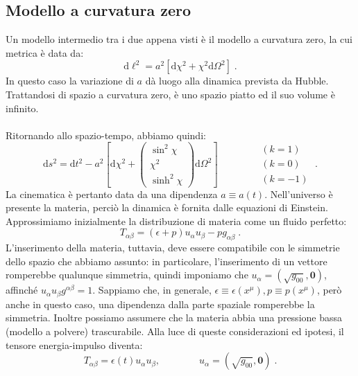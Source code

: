\documentclass[12pt,a4paper]{report}
\theoremstyle{definition}
\newcommand{\diff}[1][]{\mathrm{d}#1}
\begin{document}
\subsection{Modello a curvatura zero}
Un modello intermedio tra i due appena visti è il modello a curvatura zero, la cui metrica è data da:
\begin{equation}
\diff{\ell}^2=a^2[\diff{\chi}^2+\chi^2\diff{\Omega}^2]\;.
\end{equation}
In questo caso la variazione di $a$ dà luogo alla dinamica prevista da Hubble. Trattandosi di spazio a curvatura zero, è uno spazio piatto ed il suo volume è infinito. \\
\\
Ritornando allo spazio-tempo, abbiamo quindi:
\begin{equation}
\diff{s}^2=\diff{t}^2-a^2\left[\diff{\chi}^2+\begin{pmatrix}
\sin^2\chi \\
\chi^2 \\
\sinh^2\chi
\end{pmatrix}\diff{\Omega}^2\right]\qquad\qquad \begin{matrix}
(k=1) \\
(k=0)\\
(k=-1)
\end{matrix}\;.
\end{equation}
La cinematica è pertanto data da una dipendenza $a\equiv a(t)$. Nell'universo è presente la materia, perciò la dinamica è fornita dalle equazioni di Einstein. \\
Approssimiamo inizialmente la distribuzione di materia come un fluido perfetto:
\begin{equation}
T_{\alpha\beta}=(\epsilon+p)u_{\alpha}u_{\beta}-pg_{\alpha\beta}\;.
\end{equation}
L'inserimento della materia, tuttavia, deve essere compatibile con le simmetrie dello spazio che abbiamo assunto: in particolare, l'inserimento di un vettore romperebbe qualunque simmetria, quindi imponiamo che $u_{\alpha}=(\sqrt{g_{00}},\mathbf{0})$, affinché $u_{\alpha}u_{\beta}g^{\alpha\beta}=1$. Sappiamo che, in generale, $\epsilon\equiv\epsilon(x^{\mu}),p\equiv p(x^{\mu})$, però anche in questo caso, una dipendenza dalla parte spaziale romperebbe la simmetria. Inoltre possiamo assumere che la materia abbia una pressione bassa (modello a polvere) trascurabile. Alla luce di queste considerazioni ed ipotesi, il tensore energia-impulso diventa:
\begin{equation}
T_{\alpha\beta}=\epsilon(t)u_{\alpha}u_{\beta},\qquad\qquad u_{\alpha}=(\sqrt{g_{00}},\mathbf{0})\;.
\end{equation}
\end{document}
